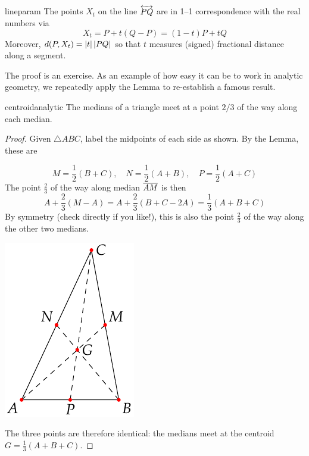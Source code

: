 \goodbreak

\fi


\begin{lemm}{}{lineparam}
The points $X_t$ on the line $\overleftrightarrow{PQ}$ are in 1--1 correspondence with the real numbers via 
\[X_t= P+t(Q-P)=(1-t)P+tQ\]
Moreover, $d(P,X_t)=\left| t\right|\left| PQ\right|$ so that $t$ measures (signed) fractional distance along a segment.
\end{lemm}

The proof is an exercise. As an example of how easy it can be to work in analytic geometry, 
we repeatedly apply the Lemma to re-establish a famous result.

\begin{thm}{}{centroidanalytic}
The medians of a triangle meet at a point $2/3$ of the way along each median.
\end{thm}


\begin{proof}
Given $\triangle ABC$, label the midpoints of each side as shown. By the Lemma, these are\par
\begin{minipage}[t]{0.7\linewidth}\vspace{-8pt}
\[M=\frac 12(B+C),\quad N=\frac 12(A+B),\quad P=\frac 12(A+C)\]
The point $\frac 23$ of the way along median $\overline{AM}$ is then
\[A+\frac 23(M-A)=A+\frac 23(B+C-2A)=\frac 13(A+B+C)\]
By symmetry (check directly if you like!), this is also the point $\frac 23$ of the way along the other two medians.
\end{minipage}\hfill\begin{minipage}[t]{0.29\linewidth}\vspace{-15pt}
\flushright\includegraphics{analytic-centroid}
\end{minipage}\medbreak
The three points are therefore identical: the medians meet at the centroid $G=\frac 13(A+B+C)$.
\end{proof}


